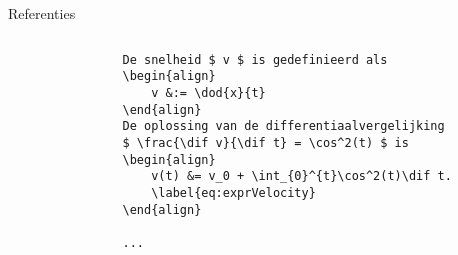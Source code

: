 \begin{frame}[fragile,t]{Referenties}
    \tiny
    \begin{columns}[t]
        \begin{column}{0.5\textwidth}%
            \begin{verbatim}
                De snelheid $ v $ is gedefinieerd als
                \begin{align}
                    v &:= \dod{x}{t}
                \end{align}
                De oplossing van de differentiaalvergelijking
                $ \frac{\dif v}{\dif t} = \cos^2(t) $ is
                \begin{align}
                    v(t) &= v_0 + \int_{0}^{t}\cos^2(t)\dif t.
                    \label{eq:exprVelocity}
                \end{align}

                ...


\end{verbatim}
\end{column}
\end{columns}
\end{frame}
